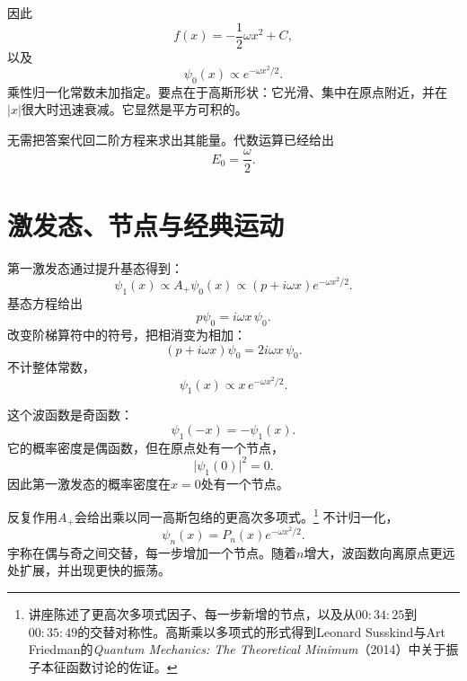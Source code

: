 \begin{classroomqa}
\end{classroomqa}

因此
\begin{equation}
f(x)=-\frac12\omega x^{2}+C,
\end{equation}
以及
\begin{equation}
\psi_{0}(x)\propto e^{-\omega x^{2}/2}.
\end{equation}
乘性归一化常数未加指定。要点在于高斯形状：它光滑、集中在原点附近，并在\(\lvert x\rvert\)很大时迅速衰减。它显然是平方可积的。

无需把答案代回二阶方程来求出其能量。代数运算已经给出
\begin{equation}
E_{0}=\frac{\omega}{2}.
\end{equation}

\section{激发态、节点与经典运动}

第一激发态通过提升基态得到：
\begin{equation}
\psi_{1}(x)\propto A_{+}\psi_{0}(x)
\propto(p+i\omega x)e^{-\omega x^{2}/2}.
\end{equation}
基态方程给出
\[
p\psi_{0}=i\omega x\,\psi_{0}.
\]
改变阶梯算符中的符号，把相消变为相加：
\begin{equation}
(p+i\omega x)\psi_{0}
=2i\omega x\,\psi_{0}.
\end{equation}
不计整体常数，
\begin{equation}
\psi_{1}(x)\propto x\,e^{-\omega x^{2}/2}.
\end{equation}

这个波函数是奇函数：
\begin{equation}
\psi_{1}(-x)=-\psi_{1}(x).
\end{equation}
它的概率密度是偶函数，但在原点处有一个节点，
\begin{equation}
\lvert\psi_{1}(0)\rvert^{2}=0.
\end{equation}
因此第一激发态的概率密度在\(x=0\)处有一个节点。

反复作用\(A_{+}\)会给出乘以同一高斯包络的更高次多项式。\footnote{讲座陈述了更高次多项式因子、每一步新增的节点，以及从\(00{:}34{:}25\)到\(00{:}35{:}49\)的交替对称性。高斯乘以多项式的形式得到Leonard Susskind与Art Friedman的\emph{Quantum Mechanics: The Theoretical Minimum}（2014）中关于振子本征函数讨论的佐证。} 不计归一化，
\begin{equation}
\psi_{n}(x)=P_{n}(x)e^{-\omega x^{2}/2}.
\end{equation}
宇称在偶与奇之间交替，每一步增加一个节点。随着\(n\)增大，波函数向离原点更远处扩展，并出现更快的振荡。

